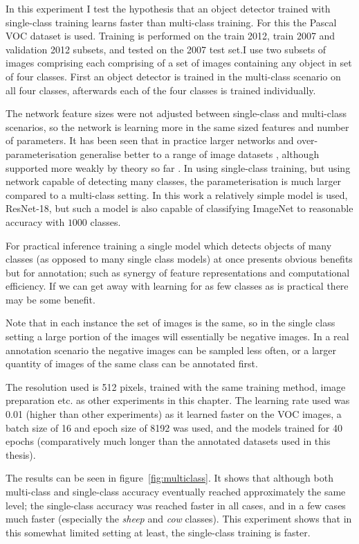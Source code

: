 In this experiment I test the hypothesis that an object detector trained with single-class training learns faster than multi-class training. For this the Pascal VOC \cite{Everingham2008} dataset is used. Training is performed on the train 2012, train 2007 and validation 2012 subsets, and tested on the 2007 test set.I use two subsets of images comprising each comprising of a set of images containing any object in set of four classes. First an object detector is trained in the multi-class scenario on all four classes, afterwards each of the four classes is trained individually. 

The network feature sizes were not adjusted between single-class and multi-class scenarios, so the network is learning more in the same sized features and number of parameters. It has been seen that in practice larger networks and over-parameterisation generalise better to a range of image datasets \cite{Kawaguchi2017}, although supported more weakly by theory so far \cite{Du2018a,Lee2019}. In using single-class training, but using network capable of detecting many classes, the parameterisation is much larger compared to a multi-class setting. In this work a relatively simple model is used, ResNet-18, but such a model is also capable of classifying ImageNet to reasonable accuracy with $1000$ classes.

For practical inference training a single model which detects objects of many classes (as opposed to many single class models) at once presents obvious benefits but for annotation; such as synergy of feature representations and computational efficiency. If we can get away with learning for as few classes as is practical there may be some benefit. 

  Note that in each instance the set of images is the same, so in the single class setting a large portion of the images will essentially be negative images. In a real annotation scenario the negative images can be sampled less often, or a larger quantity of images of the same class can be annotated first.

The resolution used is 512 pixels, trained with the same training method, image preparation etc. as other experiments in this chapter. The learning rate used was 0.01 (higher than other experiments) as it learned faster on the VOC images, a batch size of 16 and epoch size of 8192 was used, and the models trained for 40 epochs (comparatively much longer than the annotated datasets used in this thesis).  

The results can be seen in figure~\ref{fig:multiclass}. It shows that although both multi-class and single-class accuracy eventually reached approximately the same level; the single-class accuracy was reached faster in all cases, and in a few cases much faster (especially the \emph{sheep} and \emph{cow} classes). This experiment shows that in this somewhat limited setting at least, the single-class training is faster.



